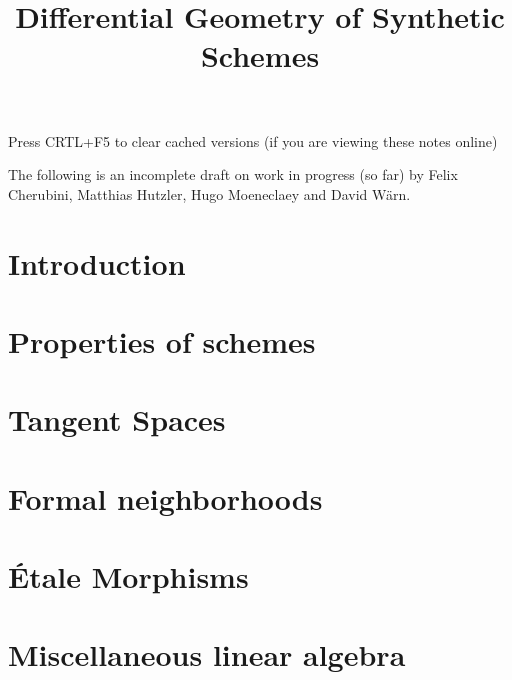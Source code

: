 \documentclass{../util/zariski}
\title{Differential Geometry of Synthetic Schemes}
\begin{document}
\maketitle

\begin{center}
  \color{purple}
  \large{Press CRTL+F5 to clear cached versions}
  \large{(if you are viewing these notes online)}
\end{center}

The following is an incomplete draft on work in progress (so far)
by Felix Cherubini, Matthias Hutzler, Hugo Moeneclaey and David Wärn.

\tableofcontents

\section*{Introduction}


\section{Properties of schemes}


\section{Tangent Spaces}



\section{Formal neighborhoods}


\section{Étale Morphisms}


\section{Miscellaneous linear algebra}


\printindex

\printbibliography
\end{document}
